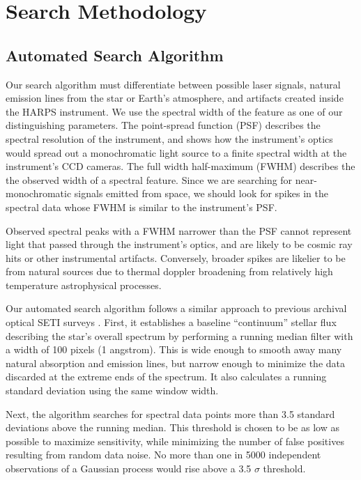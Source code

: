 \documentclass[linenumbers]{aastex631}
\begin{document}
\section{Search Methodology}
\subsection{Automated Search Algorithm}
\label{s:automated}

Our search algorithm must differentiate between possible laser signals, natural emission lines from the star or Earth's atmosphere, and artifacts created inside the HARPS instrument.  We use the spectral width of the feature as one of our distinguishing parameters. The point-spread function (PSF) describes the spectral resolution of the instrument, and shows how the instrument's optics would spread out a monochromatic light source to a finite spectral width at the instrument's CCD cameras. The full width half-maximum (FWHM) describes the the observed width of a spectral feature.  Since we are searching for near-monochromatic signals emitted from space, we should look for spikes in the spectral data whose FWHM is similar to the instrument's PSF.

Observed spectral peaks with a FWHM narrower than the PSF cannot represent light that passed through the instrument's optics, and are likely to be cosmic ray hits or other instrumental artifacts. Conversely, broader spikes are likelier to be from natural sources due to thermal doppler broadening from relatively high temperature astrophysical processes.

Our automated search algorithm follows a similar approach to previous archival optical SETI surveys \citep{Tellis_2017,Lipman_2019,Marcy_2021}. First, it establishes a baseline ``continuum'' stellar flux describing the star's overall spectrum by performing a running median filter with a width of 100 pixels (1 angstrom).  This is wide enough to smooth away many natural absorption and emission lines, but narrow enough to minimize the data discarded at the extreme ends of the spectrum.  It also calculates a running standard deviation using the same window width.

Next, the algorithm searches for spectral data points more than 3.5 standard deviations above the running median.  This threshold is chosen to be as low as possible to maximize sensitivity, while minimizing the number of false positives resulting from random data noise.  No more than one in 5000 independent observations of a Gaussian process would rise above a 3.5 $\sigma$ threshold. 
\end{document}
